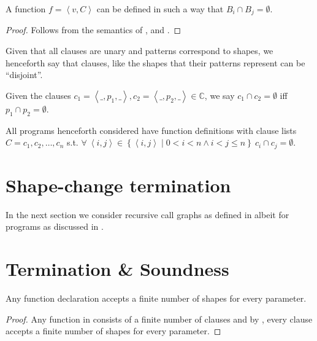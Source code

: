 \begin{theorem} A function $f = \left\langle v, C \right\rangle$ can be defined
in such a way that $B_i\cap B_j=\emptyset$.\end{theorem}

\begin{proof} Follows from the semantics of \D{},
 and . \end{proof}

Given that all clauses are unary and patterns correspond to shapes, we
henceforth say that clauses, like the shapes that their patterns represent can
be ``disjoint''.

\begin{definition} Given the clauses $c_1 = \left\langle \_, p_1, \_
\right\rangle, c_2 = \left\langle \_, p_2, \_ \right\rangle\in \mathbb{C} $, we
say $c_1\cap c_2 = \emptyset$ iff $p_1\cap p_2 = \emptyset$.\end{definition}

\begin{definition}\label{definition:nice-3} All programs henceforth considered
have function definitions with clause lists $C=c_1,c_2,\ldots,c_n$ s.t.
$\forall\ \left\langle i,j \right\rangle \in \left\{ \left\langle i, j
\right\rangle \mid 0 < i < n \wedge i < j \leq n \right\}\ c_i \cap c_j =
\emptyset $.\end{definition}

\section{Shape-change termination}

In the next section we consider recursive call graphs as defined in
 albeit for programs as discussed in
.

\section{Termination \& Soundness}

\begin{lemma}\label{lemma:extend-function-finite-shape} Any function
declaration accepts a finite number of shapes for every parameter.\end{lemma}

\begin{proof} Any function in \D{} consists of a finite number of clauses and
by , every clause accepts a finite number of
shapes for every parameter.\end{proof}

